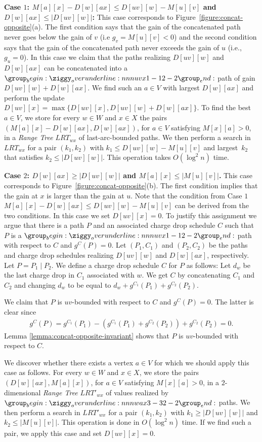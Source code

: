 \documentclass[11pt]{article}
\begin{document}
\textbf{Case $1$: 
$M[a][x]-D[w][ax] \le D[uv][w]-M[u][v]$ and $D[w][ax] \le |D[uv][w]|$:} 
This case corresponds to Figure~\ref{figure:concat-opposite}(a).
The first condition says that the gain of the concatenated path never goes below the gain of $v$ (i.e $g_v=M[u][v] < 0$) and the second condition says that the gain of the concatenated path never exceeds the gain of $u$ (i.e., $g_u=0$).
In this case we claim that the paths realizing $D[uv][w]$ and $D[w][ax]$ can be concatenated into a $\overunderline{uvx}{1-1}{2-2}$ path of gain $D[uv][w]+D[w][ax]$.  We find such an $a\in V$ with largest $D[w][ax]$ and perform the update $D[uv][x]= \max \{D[uv][x], D[uv][w] + D[w][ax] \}$. To find the best $a\in V$, we store for every $w\in W$ and $x\in X$ the pairs $(M[a][x]-D[w][ax], D[w][ax])$, for $a\in V$ satisfying $M[x][a]>0$, in a \emph{Range Tree} $LRT_{wx}$ of last-arc-bounded paths. We then perform a search in $LRT_{wx}$ for a pair $(k_1,k_2)$ with $k_1 \le D[uv][w]-M[u][v]$ and largest~$k_2$ that satisfies $k_2 \le |D[uv][w]|$. This operation takes $O(\log^2 n)$ time.


\textbf{Case $2$:
  $ D[w][ax] \ge |D[uv][w]|$ and $M[a][x] \le |M[u][v]|$.}
 This case corresponds to Figure~\ref{figure:concat-opposite}(b).
  The first condition implies that the gain at $x$ is larger than the gain at $u$. Note that the condition from Case $1$ $M[a][x]-D[w][ax] \le D[uv][w]-M[u][v]$ can be derived from the two conditions.
 In this case we set $D[uv][x]=0$. To justify this assignment we argue that there is a path $P$ and an associated charge drop schedule $C$ such that $P$ is a $\overunderline{uvx}{1-1}{2-2}$ path with respect to $C$ and $g^C(P)=0$.
 Let $(P_1,C_1)$ and $(P_2,C_2)$ be the paths and charge drop schedules realizing $D[uv][w]$ and $D[w][ax]$, respectively.
Let $P = P_1\mid P_2$. We define a charge drop schedule $C$ for $P$ as follows: Let $d_w$ be the last charge drop in $C_1$ associated with $w$. We get $C$ by concatenating $C_1$ and $C_2$ and changing $d_w$ to be equal to $d_w+g^{C_1}(P_1)+g^{C_2}(P_2)$.


We claim that $P$ is $uv$-bounded with respect to $C$ and $g^C(P) = 0$. The latter is clear since 
\begin{align*}
    g^C(P) = g^{C_1}(P_1)- (g^{C_1}(P_1)+g^{C_2}(P_2)) + g^{C_2}(P_2) = 0.
\end{align*}
Lemma \ref{lemma:concat-opposite-invariant} shows that $P$ is $uv$-bounded with respect to $C$.

We discover whether there exists a vertex  $a\in V$ for which we should apply this case as follows. For every $w\in W$ and $x\in X$,
we store the pairs $(D[w][ax], M[a][x])$, for $a\in V$ satisfying $M[x][a]>0$, in a $2$-dimensional \emph{Range Tree} $LRT'_{wx}$ of values realized by $\overunderline{wax}{3-3}{2-2}$ paths.
We then perform a search in $LRT'_{wx}$ for a pair $(k_1,k_2)$ with $k_1 \ge |D[uv][w]|$ and $k_2\le |M[u][v]|$. This operation is done in $O(\log^2 n)$ time. If we find such a pair, we
apply this case and set
$D[uv][x]=0$.
\end{document}
